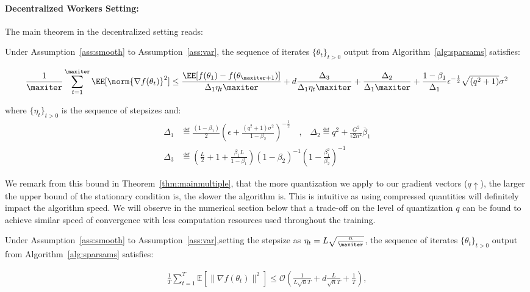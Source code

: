 \documentclass[11pt]{article}
\begin{document}
\paragraph{Decentralized Workers Setting:}

The main theorem in the decentralized setting reads:

\begin{Theorem}\label{thm:mainmultiple}
Under Assumption~\ref{ass:smooth} to Assumption~\ref{ass:var}, the sequence of iterates $\{\theta_t\}_{t>0}$ output from Algorithm~\ref{alg:sparsams} satisfies:

\begin{equation}
\begin{split}
 \frac{1}{\maxiter}\sum_{t=1}^{\maxiter} \EE[\norm{\nabla f(\theta_t)}^2] \leq \frac{\EE[ f(\theta_{1}) - f(\theta_{\maxiter+1})]}{ \Delta_1 \eta_t \maxiter} + 
d\frac{ \Delta_3}{\Delta_1 \eta_t \maxiter}  + \frac{\Delta_2}{ \Delta_1\maxiter} +\frac{1-\beta_1}{\Delta_1}  \epsilon^{-\frac{1}{2}} \sqrt{(q^2+1)}\sigma^2 
\end{split}
\end{equation}


where $\{\eta_t\}_{t>0}$ is the sequence of stepsizes and:
\begin{equation}
\begin{split}
\Delta_1 & \eqdef \frac{(1-\beta_1)}{2} (\epsilon + \frac{(q^2+1)\sigma^2}{1 - \beta_2})^{-\frac{1}{2}} \quad \textrm{,} \quad \Delta_2 \eqdef q^2 + \frac{G^2 }{\epsilon 2n^2}  \overline{\beta}_1\\
\Delta_3 &\eqdef \left(\frac{L}{2} + 1+ \frac{\beta_1L}{1-\beta_1} \right) (1-\beta_2)^{-1} (1 - \frac{\beta_1^{2}}{\beta_2})^{-1}
\end{split}
\end{equation}
\end{Theorem}

We remark from this bound in Theorem~\ref{thm:mainmultiple}, that the more quantization we apply to our gradient vectors ($q \uparrow$), the larger the upper bound of the stationary condition is, \ie the slower the algorithm is. 
This is intuitive as using compressed quantities will definitely impact the algorithm speed.
We will observe in the numerical section below that a trade-off on the level of quantization $q$ can be found to achieve similar speed of convergence with less computation resources used throughout the training.


\begin{Corollary}\label{coro:mainmultiple}
Under Assumption~\ref{ass:smooth} to Assumption~\ref{ass:var},setting the stepsize as $\eta_t = L\sqrt{\frac{n}{\maxiter}}$, the sequence of iterates $\{\theta_t\}_{t>0}$ output from Algorithm~\ref{alg:sparsams} satisfies:

\begin{align*}
    \frac{1}{T}\sum_{t=1}^T \mathbb E[\|\nabla f(\theta_t)\|^2]\leq \mathcal O(\frac{1}{L\sqrt nT}+ d\frac{L}{\sqrt nT}+\frac{1}{T}),
\end{align*}
\end{Corollary}
\end{document}
